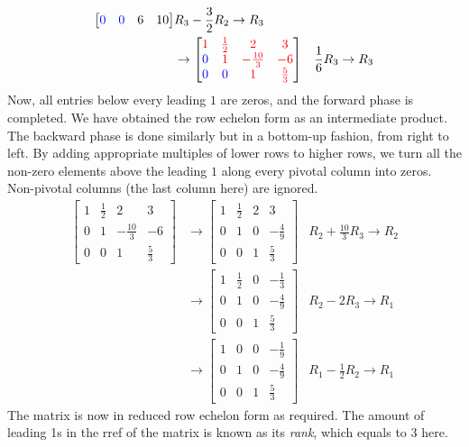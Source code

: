 \begin{solution}
\begin{align*}
\begin{bmatrix}
\textcolor{blue}{0} & \textcolor{blue}{0} & 6 & 10
\end{bmatrix}
& R_3-\frac{3}{2}R_2 \to R_3 \\
&\to
\begin{bmatrix}
\textcolor{red}{1} & \textcolor{red}{\frac{1}{2}} & \textcolor{red}{2} & \textcolor{red}{3} \\
\textcolor{blue}{0} & \textcolor{red}{1} & \textcolor{red}{-\frac{10}{3}} & \textcolor{red}{-6} \\
\textcolor{blue}{0} & \textcolor{blue}{0} & \textcolor{red}{1} & \textcolor{red}{\frac{5}{3}}
\end{bmatrix}
& \frac{1}{6}R_3 \to R_3 
\end{align*}
Now, all entries below every leading $1$ are zeros, and the forward phase is completed. We have obtained the row echelon form as an intermediate product. The backward phase is done similarly but in a bottom-up fashion, from right to left. By adding appropriate multiples of lower rows to higher rows, we turn all the non-zero elements above the leading $1$ along every pivotal column into zeros. Non-pivotal columns (the last column here) are ignored.
\begin{align*}
\begin{bmatrix}
1 & \frac{1}{2} & 2 & 3 \\
0 & 1 & -\frac{10}{3} & -6 \\
0 & 0 & 1 & \frac{5}{3}
\end{bmatrix} 
&\to
\begin{bmatrix}
1 & \frac{1}{2} & 2 & 3 \\
0 & 1 & 0 & -\frac{4}{9} \\
0 & 0 & 1 & \frac{5}{3}
\end{bmatrix} 
& R_2 + \frac{10}{3}R_3 \to R_2 \\
&\to
\begin{bmatrix}
1 & \frac{1}{2} & 0 & -\frac{1}{3} \\
0 & 1 & 0 & -\frac{4}{9} \\
0 & 0 & 1 & \frac{5}{3}
\end{bmatrix} 
& R_2 - 2R_3 \to R_1 \\
&\to
\begin{bmatrix}
1 & 0 & 0 & -\frac{1}{9} \\
0 & 1 & 0 & -\frac{4}{9} \\
0 & 0 & 1 & \frac{5}{3}
\end{bmatrix} 
& R_1 - \frac{1}{2}R_2 \to R_1
\end{align*}
The matrix is now in reduced row echelon form as required. The amount of leading 1s in the rref of the matrix is known as its \textit{rank}, which equals to $3$ here.
\end{solution}
